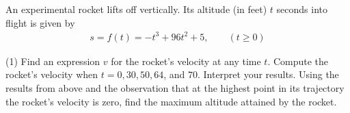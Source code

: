 \documentclass[../mathNotesPreamble]{subfiles}
\begin{document}
  \begin{ex*}
    An experimental rocket lifts off vertically. Its altitude (in feet) $t$ seconds into flight is given by 
    \begin{align*}
      s=f(t)=-t^3+96t^2+5, \qquad (t\geq 0)
    \end{align*}
  \end{ex*}
  \begin{extasks}[after-item-skip=\stretch{1}](1)
    \task Find an expression $v$ for the rocket's velocity at any time $t$.
    \task Compute the rocket's velocity when $t=0, 30, 50, 64$, and $70$. Interpret your results. 
    \task Using the results from above and the observation that at the highest point in its trajectory the rocket's velocity is zero, find the maximum altitude attained by the rocket.
  \end{extasks}
  \pagebreak

  \pagebreak
\end{document}
